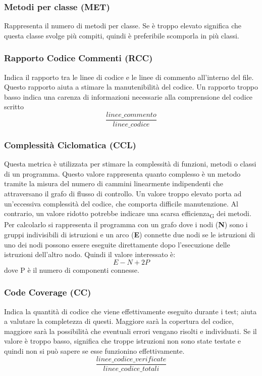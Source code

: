 \subsubsection{Metodi per classe (MET)}
Rappresenta il numero di metodi per classe. Se è troppo elevato significa che questa classe svolge più compiti, quindi è preferibile scomporla in più classi.

\subsubsection{Rapporto Codice Commenti (RCC)}
Indica il rapporto tra le linee di codice e le linee di commento all'interno del file. Questo rapporto aiuta a stimare la manutenibilità del codice. Un rapporto troppo basso indica una carenza di informazioni necessarie alla comprensione del codice scritto
\[\frac{linee\_commento}{linee\_codice}\]

\subsubsection{Complessità Ciclomatica (CCL)}
Questa metrica è utilizzata per stimare la complessità di funzioni, metodi o classi di un programma. Questo valore rappresenta quanto complesso è un metodo tramite la misura del numero di cammini linearmente indipendenti che attraversano il grafo di flusso di controllo. Un valore troppo elevato porta ad un’eccessiva complessità del codice, che comporta difficile manutenzione. Al contrario, un valore ridotto potrebbe indicare una scarsa efficienza\textsubscript{G} dei metodi. Per calcolarlo si rappresenta il programma con un grafo dove i  nodi (\textbf{N}) sono i gruppi indivisibili di istruzioni e un arco (\textbf{E}) connette due nodi se le istruzioni di uno dei nodi possono essere eseguite direttamente dopo l’esecuzione delle istruzioni dell’altro nodo. Quindi il valore interessato è:
\[E-N+2P\] 
dove P è il numero di componenti connesse.
\subsubsection{Code Coverage (CC)}
Indica la quantità di codice che viene effettivamente eseguito durante i test; aiuta a valutare la completezza di questi. Maggiore sarà la copertura del codice, maggiore sarà la possibilità che eventuali errori vengano risolti e individuati. Se il valore è troppo basso, significa che troppe istruzioni non sono state testate e quindi non si può sapere se esse funzionino effettivamente.
\[\frac{linee\_codice\_verificate}{linee\_codice\_totali}\]

